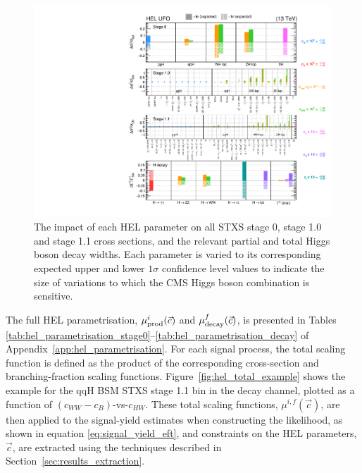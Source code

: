 \begin{figure}
  \centering
  \hspace*{-1.4cm}
  \includegraphics[width=1.2\textwidth]{Figures/eft/scaling_functions/HEL_summary.pdf}
  \hspace*{-1.4cm}
  \caption[HEL summary]
  {
    The impact of each HEL parameter on all STXS stage 0, stage 1.0 and stage 1.1 cross sections, and the relevant partial and total Higgs boson decay widths. Each parameter is varied to its corresponding expected upper and lower $1\sigma$ confidence level values to indicate the size of variations to which the CMS Higgs boson combination is sensitive.
  }
  \label{fig:hel_summary}
\end{figure}

The full HEL parametrisation, $\mu_{\rm{prod}}^i(\vec{c})$ and $\mu_{\rm{decay}}^f(\vec{c})$, is presented in Tables \ref{tab:hel_parametrisation_stage0}--\ref{tab:hel_parametrisation_decay} of Appendix~\ref{app:hel_parametrisation}. For each signal process, the total scaling function is defined as the product of the corresponding cross-section and branching-fraction scaling functions. Figure~\ref{fig:hel_total_example} shows the example for the qqH BSM STXS stage 1.1 bin in the \Hfl decay channel, plotted as a function of $(c_{WW}-c_B)$-vs-$c_{HW}$. These total scaling functions, $\mu^{i,f}(\vec{c})$, are then applied to the signal-yield estimates when constructing the likelihood, as shown in equation \ref{eq:signal_yield_eft}, and constraints on the HEL parameters, $\vec{c}$, are extracted using the techniques described in Section~\ref{sec:results_extraction}.

